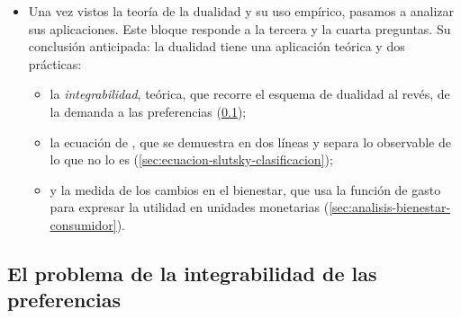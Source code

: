 \documentclass[11pt]{article}
\begin{document}
\begin{itemize}
\item Una vez vistos la teoría de la dualidad y su uso empírico, pasamos a analizar sus aplicaciones. Este bloque responde a la tercera y la cuarta preguntas. Su conclusión anticipada: la dualidad tiene una aplicación teórica y dos prácticas:
  \begin{itemize}
  \item la \emph{integrabilidad}, teórica, que recorre el esquema de dualidad al revés, de la demanda a las preferencias (\ref{sec:problema-integrabilidad-preferencias});
  \item la ecuación de , que se demuestra en dos líneas y separa lo observable de lo que no lo es (\ref{sec:ecuacion-slutsky-clasificacion});
  \item y la medida de los cambios en el bienestar, que usa la función de gasto para expresar la utilidad en unidades monetarias (\ref{sec:analisis-bienestar-consumidor}).
  \end{itemize}
\end{itemize}

\subsection{El problema de la integrabilidad de las preferencias}\label{sec:problema-integrabilidad-preferencias}
\end{document}
